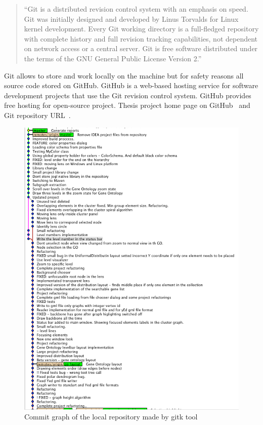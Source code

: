 \begin{quotation}
``Git is a distributed revision control system with an emphasis on speed.
Git was initially designed and developed by Linus Torvalds for Linux kernel development.
Every Git working directory is a full-fledged repository with complete history and full revision tracking capabilities,
not dependent on network access or a central server. Git is free software distributed under the terms of the
GNU General Public License Version 2.''~\cite{GIT}
\end{quotation}

Git allows to store and work locally on the machine but for safety reasons all source code stored on GitHub.
GitHub is a web-based hosting service for software development projects that use the Git revision control system.
GitHub provides free hosting for open-source project. Thesis project home page on GitHub~\cite{GitHub_homepage} and Git repository URL~\cite{GitHub_repository}.

\begin{figure}[h!]
\centering
\includegraphics[scale=0.6]{pictures/commit_graph_gitk.png}
\caption{Commit graph of the local repository made by gitk tool}
\end{figure}


